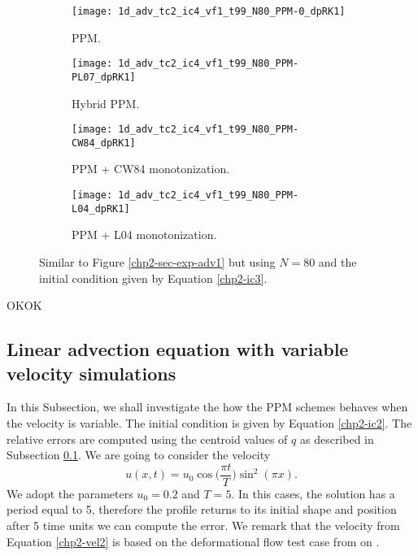 \begin{figure}[!htb]
  \centering
  \begin{subfigure}{0.49\textwidth}
    \centering
			\texttt{[image: 1d\_adv\_tc2\_ic4\_vf1\_t99\_N80\_PPM-0\_dpRK1]}
			\caption{PPM.\label{chp2-sec-exp-adv3-a}}
  \end{subfigure}
  \begin{subfigure}{0.49\textwidth}
    \centering
			\texttt{[image: 1d\_adv\_tc2\_ic4\_vf1\_t99\_N80\_PPM-PL07\_dpRK1]}
			\caption{Hybrid PPM.\label{chp2-sec-exp-adv3-b}}
  \end{subfigure}

  \begin{subfigure}{0.49\textwidth}
    \centering
		\texttt{[image: 1d\_adv\_tc2\_ic4\_vf1\_t99\_N80\_PPM-CW84\_dpRK1]}
    \caption{PPM + CW84 monotonization.\label{chp2-sec-exp-adv3-c}}
  \end{subfigure}
  \begin{subfigure}{0.49\textwidth}
    \centering
			\texttt{[image: 1d\_adv\_tc2\_ic4\_vf1\_t99\_N80\_PPM-L04\_dpRK1]}
      \caption{PPM + L04 monotonization.\label{chp2-sec-exp-adv3-d}}
  \end{subfigure} 
	\caption{ Similar to Figure \ref{chp2-sec-exp-adv1} but using $N=80$
	and the initial condition given by Equation \eqref{chp2-ic3}.\label{chp2-sec-exp-adv3}}
\end{figure}
OKOK

\newpage

\subsection{Linear advection equation with variable velocity simulations}
\label{chp2-sec-numerical-exp-2}
In this Subsection, we shall investigate the how the PPM schemes behaves when the velocity is variable.
The initial condition is given by Equation \eqref{chp2-ic2}.
The relative errors are computed using the centroid values of $q$ as described in
Subsection \ref{chp2-sec-numerical-exp-2}. We are going to consider the velocity
\begin{equation}
	\label{chp2-vel2}
	u(x,t) = u_0\cos{\bigg(\frac{\pi t}{T}\bigg)}\sin^2(\pi x).
\end{equation}
We adopt the parameters $u_0 = 0.2$ and $T = 5$.
In this cases, the solution has a period equal to 5, therefore the profile returns to its
initial shape and position after 5 time units we can compute the error.
We remark that the velocity from Equation \eqref{chp2-vel2} is based on the deformational flow 
test case from on \citet{nair:2010}.

